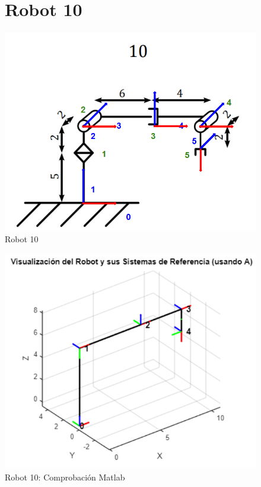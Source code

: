 \begin{figure}
\section{Robot 10}
	\centering
	\includegraphics[width=0.5\linewidth]{img/Robot10_1}
	\caption{Robot 10}
	\label{fig:robot10_1}
\end{figure}


\begin{figure}
	\centering
	\includegraphics[width=0.7\linewidth]{img/Robot10}
	\caption{Robot 10: Comprobación Matlab}
	\label{fig:robot10}
\end{figure}
